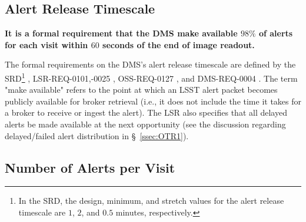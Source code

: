 \documentclass[DM,authoryear,toc]{lsstdoc}
\begin{document}
\subsection{Alert Release Timescale}\label{ssec:OTT1}

{\bf It is a formal requirement that the DMS make available $98\%$ of alerts for each visit within $60$ seconds of the end of image readout.}

The formal requirements on the DMS's alert release timescale are defined by the SRD\footnote{In the SRD, the design, minimum, and stretch values for the alert release timescale are $1$, $2$, and $0.5$ minutes, respectively.} , LSR-REQ-0101,-0025 , OSS-REQ-0127 , and DMS-REQ-0004 . The term "make available" refers to the point at which an LSST alert packet becomes publicly available for broker retrieval (i.e., it does not include the time it takes for a broker to receive or ingest the alert). The LSR also specifies that all delayed alerts be made available at the next opportunity (see the discussion regarding delayed/failed alert distribution in \S~\ref{ssec:OTR1}).




\subsection{Number of Alerts per Visit}\label{ssec:transN}
\end{document}
